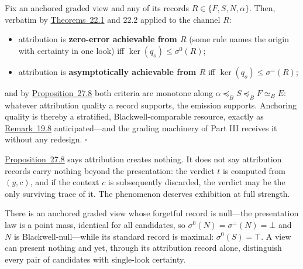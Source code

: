 \begin{thmplain}

Fix an anchored graded view and any of its records \(R \in \{F, S, N, \alpha\}\). Then, verbatim by \hyperlink{stmt:22.1}{Theorems~22.1} and 22.2 applied to the channel \(R\):

\begin{itemize}
\tightlist
\item
  attribution is \textbf{zero-error achievable from \(R\)} (some rule names the origin with certainty in one look) iff \(\ker(q_o) \le \sigma^{0}(R)\);
\item
  attribution is \textbf{asymptotically achievable from \(R\)} iff \(\ker(q_o) \le \sigma^{=}(R)\);
\end{itemize}

and by \hyperlink{stmt:27.8}{Proposition~27.8} both criteria are monotone along \(\alpha \preceq_B S \preceq_B F \simeq_B E\): whatever attribution quality a record supports, the emission supports. Anchoring quality is thereby a stratified, Blackwell-comparable resource, exactly as \hyperlink{stmt:19.8}{Remark~19.8} anticipated---\hspace{0pt}and the grading machinery of Part III receives it without any redesign. \(\square\)
\end{thmplain}


\hyperlink{stmt:27.8}{Proposition~27.8} says attribution creates nothing. It does not say attribution records carry nothing beyond the presentation: the verdict \(t\) is computed from \((y, c)\), and if the context \(c\) is subsequently discarded, the verdict may be the only surviving trace of it. The phenomenon deserves exhibition at full strength.

\begin{thmplain}

There is an anchored graded view whose forgetful record is null---\hspace{0pt}the presentation law is a point mass, identical for all candidates, so \(\sigma^{0}(N) = \sigma^{=}(N) = \bot\) and \(N\) is Blackwell-null---\hspace{0pt}while its standard record is maximal: \(\sigma^{0}(S) = \top\). A view can present nothing and yet, through its attribution record alone, distinguish every pair of candidates with single-look certainty.
\end{thmplain}

